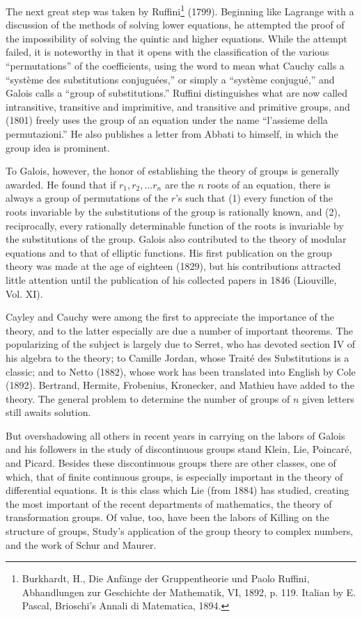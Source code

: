 \documentclass[oneside]{book}
\begin{document}
The next great step was taken by Ruffini\footnote{Burkhardt, H.,
Die Anf\"ange der Gruppentheorie und Paolo Ruffini, Abhandlungen zur
Geschichte der Mathematik, VI, 1892, p. 119. Italian by E. Pascal,
Brioschi's Annali di Matematica, 1894.} (1799). Beginning like
Lagrange with a discussion of the methods of solving lower
equations, he attempted the proof of the impossibility of solving
the quintic and higher equations. While the attempt failed, it is
noteworthy in that it opens with the classification of the various
``permutations'' of the coefficients, using the word to mean what
Cauchy calls a ``syst\`eme des substitutions conjugu\'ees,'' or
simply a ``syst\`eme conjugu\'e,'' and Galois calls a ``group of
substitutions.'' Ruffini distinguishes what are now called
intransitive, transitive and imprimitive, and transitive and
primitive groups, and (1801) freely uses the group of an equation
under the name ``l'assieme della permutazioni.'' He also publishes a
letter from Abbati to himself, in which the group idea is prominent.

To Galois, however, the honor of establishing the theory of groups
is generally awarded. He found that if $r_1, r_2, \ldots r_n$ are
the $n$ roots of an equation, there is always a group of
permutations of the $r$'s such that (1) every function of the roots
invariable by the substitutions of the group is rationally known,
and (2), reciprocally, every rationally determinable function of the
roots is invariable by the substitutions of the group. Galois also
contributed to the theory of modular equations and to that of
elliptic functions. His first publication on the group theory was
made at the age of eighteen (1829), but his contributions attracted
little attention until the publication of his collected papers in
1846 (Liouville, Vol. XI).

Cayley and Cauchy were among the first to appreciate the importance
of the theory, and to the latter especially are due a number of
important theorems. The popularizing of the subject is largely due
to Serret, who has devoted section IV of his algebra to the theory;
to Camille Jordan, whose Trait\'e des Substitutions is a classic;
and to Netto (1882), whose work has been translated into English by
Cole (1892). Bertrand, Hermite, Frobenius, Kronecker, and Mathieu
have added to the theory. The general problem to determine the
number of groups of $n$ given letters still awaits solution.

But overshadowing all others in recent years in carrying on the
labors of Galois and his followers in the study of discontinuous
groups stand Klein, Lie, Poincar\'e, and Picard. Besides these
discontinuous groups there are other classes, one of which, that of
finite continuous groups, is especially important in the theory of
differential equations. It is this class which Lie (from 1884) has
studied, creating the most important of the recent departments of
mathematics, the theory of transformation groups. Of value, too,
have been the labors of Killing on the structure of groups, Study's
application of the group theory to complex numbers, and the work of
Schur and Maurer.
\end{document}
